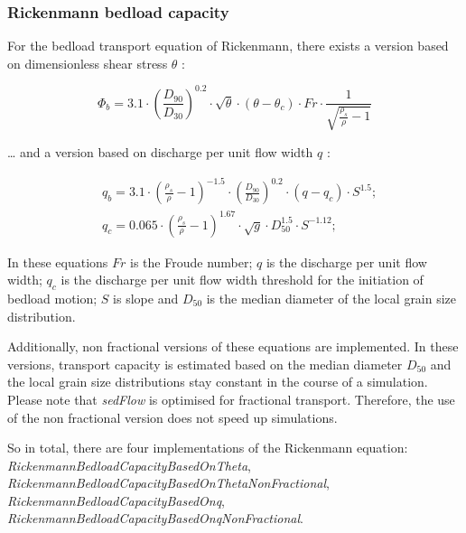 \documentclass[11pt,a4paper]{article}
\begin{document}
\subsubsection{Rickenmann bedload capacity}\label{RickenmannBedloadCapacity}
For the bedload transport equation of Rickenmann, there exists a version based on dimensionless shear stress $\theta$ \citep{Rickenmann2001}:

\begin{equation}
\label{FullRickenmannBedloadCapacityBasedOnTheta}
\Phi_b = 3.1 \cdot {\left( \frac{D_{90}}{D_{30}} \right)}^{0.2} \cdot \sqrt{\theta} \cdot \left( \theta - \theta_c \right) \cdot Fr \cdot \frac{1}{\sqrt{\frac{\rho_s}{\rho} - 1}}
\end{equation}

\dots{} and a version based on discharge per unit flow width $q$ \citep{Rickenmann2001}:

\begin{subequations}
\begin{align}
&q_b = 3.1 \cdot \left( \frac{\rho_s}{\rho} - 1 \right)^{-1.5} \cdot \left( \frac{D_{90}}{D_{30}} \right)^{0.2} \cdot \left( q - q_c \right) \cdot S^{1.5};\\
&q_c = 0.065 \cdot \left( \frac{\rho_s}{\rho} - 1 \right)^{1.67} \cdot \sqrt{g} \cdot D^{1.5}_{50} \cdot S^{-1.12};
\end{align}
\end{subequations}

In these equations $Fr$ is the Froude number; $q$ is the discharge per unit flow width; $q_c$ is the discharge per unit flow width threshold for the initiation of bedload motion; $S$ is slope and $D_{50}$ is the median diameter of the local grain size distribution.

Additionally, non fractional versions of these equations are implemented. In these versions, transport capacity is estimated based on the median diameter $D_{50}$ and the local grain size distributions stay constant in the course of a simulation. Please note that \emph{sedFlow} is optimised for fractional transport. Therefore, the use of the non fractional version does not speed up simulations.

So in total, there are four implementations of the Rickenmann equation: \emph{RickenmannBedloadCapacityBasedOnTheta}, \emph{RickenmannBedloadCapacityBasedOnThetaNonFractional}, \emph{RickenmannBedloadCapacityBasedOnq}, \emph{RickenmannBedloadCapacityBasedOnqNonFractional}.
\end{document}
